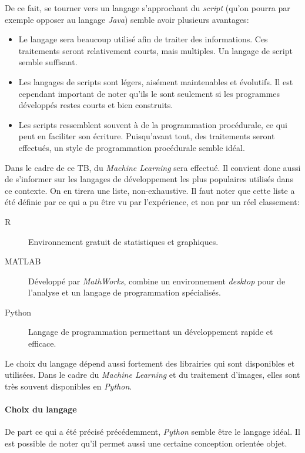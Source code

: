 De ce fait, se tourner vers un langage s'approchant du \textit{script} (qu'on pourra par exemple opposer au langage \textit{Java}) semble avoir plusieurs avantages:
\begin{itemize}
    \item Le langage sera beaucoup utilisé afin de traiter des informations. Ces traitements seront relativement courts, mais multiples. Un langage de script semble suffisant.
    \item Les langages de scripts sont légers, aisément maintenables et évolutifs. Il est cependant important de noter qu'ils le sont seulement si les programmes développés restes courts et bien construits. 
    \item Les scripts ressemblent souvent à de la programmation procédurale, ce qui peut en faciliter son écriture. Puisqu'avant tout, des traitements seront effectués, un style de programmation procédurale semble idéal.
\end{itemize}

Dans le cadre de ce TB, du \textit{Machine Learning} sera effectué. Il convient donc aussi de s'informer sur les langages de développement les plus populaires utilisés dans ce contexte. On en tirera une liste, non-exhaustive. Il faut noter que cette liste a été définie par ce qui a pu être vu par l'expérience, et non par un réel classement:
\begin{description}
    \item[R] Environnement gratuit de statistiques et graphiques.\autocite{lang:R}
    \item[MATLAB] Développé par \textit{MathWorks}, combine un environnement \textit{desktop} pour de l'analyse et un langage de programmation spécialisés.\autocite{lang:matlab}
    \item[Python] Langage de programmation permettant un développement rapide et efficace. \autocite{lang:python}
\end{description}

Le choix du langage dépend aussi fortement des librairies qui sont disponibles et utilisées. Dans le cadre du \textit{Machine Learning} et du traitement d'images, elles sont très souvent disponibles en \textit{Python}.

\paragraph{Choix du langage}
De part ce qui a été précisé précédemment, \textit{Python} semble être le langage idéal. Il est possible de noter qu'il permet aussi une certaine conception orientée objet.

